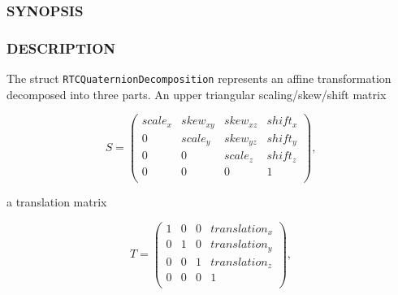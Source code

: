 \subsubsection{SYNOPSIS}\label{synopsis}

\begin{Shaded}
\begin{Highlighting}[]
\OperatorTok{\{}
  \OperatorTok{,}\OperatorTok{,}\OperatorTok{;}
  \OperatorTok{,}\OperatorTok{,}\OperatorTok{;}
  \OperatorTok{,}\OperatorTok{,}\OperatorTok{;}
  \OperatorTok{,}\OperatorTok{,}\OperatorTok{,}\OperatorTok{;}
  \OperatorTok{,}\OperatorTok{,}\OperatorTok{;}
\OperatorTok{\};}
\end{Highlighting}
\end{Shaded}

\subsubsection{DESCRIPTION}\label{description}

The struct \texttt{RTCQuaternionDecomposition} represents an affine
transformation decomposed into three parts. An upper triangular
scaling/skew/shift matrix

\[
S = \left( \begin{array}{cccc}
scale_x & skew_{xy} & skew_{xz} & shift_x \\ 
0 & scale_y & skew_{yz} & shift_y \\ 
0 & 0 & scale_z & shift_z \\ 
0 & 0 & 0 & 1 \\ 
\end{array} \right),
\]

a translation matrix

\[
T = \left( \begin{array}{cccc}
1 & 0 & 0 & translation_x \\ 
0 & 1 & 0 & translation_y \\ 
0 & 0 & 1 & translation_z \\ 
0 & 0 & 0 & 1 \\ 
\end{array} \right),
\]

